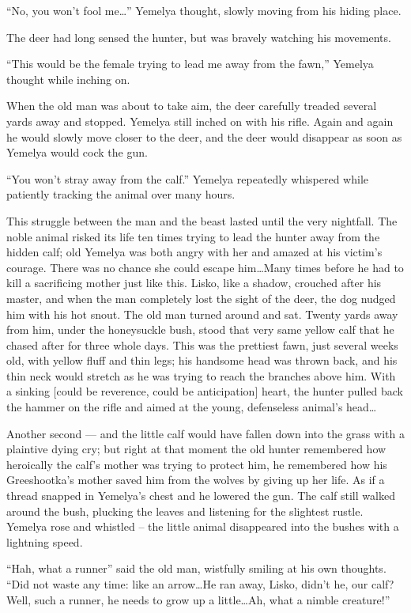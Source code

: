 \documentclass[b5paper,12pt,openany]{book}
\begin{document}
``No, you won't fool me\ldots'' Yemelya thought, slowly moving from his hiding place.

The deer had long sensed the hunter, but was bravely watching his movements.

``This would be the female trying to lead me away from the fawn,'' Yemelya thought while inching on.

When the old man was about to take aim, the deer carefully treaded several yards away and stopped. Yemelya still inched on with his rifle. Again and again he would slowly move closer to the deer, and the deer would disappear as soon as Yemelya would cock the gun.

``You won't stray away from the calf.'' Yemelya repeatedly whispered while patiently tracking the animal over many hours.

This struggle between the man and the beast lasted until the very nightfall. The noble animal risked its life ten times trying to lead the hunter away from the hidden calf; old Yemelya was both angry with her and amazed at his victim's courage. There was no chance she could escape him\ldots Many times before he had to kill a sacrificing mother just like this. Lisko, like a shadow, crouched after his master, and when the man completely lost the sight of the deer, the dog nudged him with his hot snout. The old man turned around and sat. Twenty yards away from him, under the honeysuckle bush, stood that very same yellow calf that he chased after for three whole days. This was the prettiest fawn, just several weeks old, with yellow fluff and thin legs; his handsome head was thrown back, and his thin neck would stretch as he was trying to reach the branches above him. With a sinking [could be reverence, could be anticipation] heart, the hunter pulled back the hammer on the rifle and aimed at the young, defenseless animal's head\ldots

Another second --- and the little calf would have fallen down into the grass with a plaintive dying cry; but right at that moment the old hunter remembered how heroically the calf's mother was trying to protect him, he remembered how his Greeshootka's mother saved him from the wolves by giving up her life. As if a thread snapped in Yemelya's chest and he lowered the gun. The calf still walked around the bush, plucking the leaves and listening for the slightest rustle. Yemelya rose and whistled -- the little animal disappeared into the bushes with a lightning speed.

``Hah, what a runner'' said the old man, wistfully smiling at his own thoughts. ``Did not waste any time: like an arrow\ldots He ran away, Lisko, didn't he, our calf? Well, such a runner, he needs to grow up a little\ldots Ah, what a nimble creature!''
\end{document}
